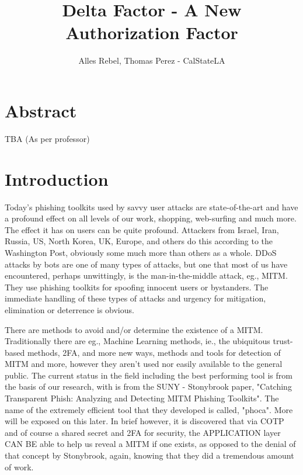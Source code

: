 \documentclass[a4paper, 11pt]{ article}
\title{Delta Factor - A New Authorization Factor}
\author{Alles Rebel, Thomas Perez - CalStateLA}
\begin{document}
\maketitle

\section{Abstract}
TBA (As per professor) %
\section{Introduction}
\setlength{\baselineskip}{1.5\baselineskip}
\indent

Today’s phishing toolkits used by savvy user attacks are state-of-the-art and have a profound effect on all levels of our work, shopping, web-surfing and much more. The effect it has on users can be quite profound. Attackers from Israel, Iran, Russia, US, North Korea, UK, Europe, and others do this according to the Washington Post, obviously some much more than others as a whole. DDoS attacks by bots are one of many types of attacks, but one that most of us have encountered, perhaps unwittingly, is the  man-in-the-middle attack, eg., MITM. They use phishing toolkits for spoofing innocent users or bystanders. The immediate handling of these types of attacks and urgency for mitigation, elimination or deterrence is obvious. 


There are methods to avoid and/or determine the existence of a MITM. Traditionally there are eg., Machine Learning methods, ie., the ubiquitous trust-based methods, 2FA, and more new ways, methods and tools for detection of MITM and more, however they aren't used nor easily available to the general public.
The current status in the field including the best performing tool is from the basis of our research, with is from the SUNY - Stonybrook paper, "Catching Transparent Phish: Analyzing and Detecting MITM  Phishing Toolkits". The name of the extremely efficient tool that they developed is called, "phoca".
More will be exposed on this later. In brief however, it is discovered that via COTP and of course a shared secret and 2FA for security, the APPLICATION layer CAN BE able to help us reveal a MITM if one exists, as opposed to the denial of that concept by Stonybrook, again, knowing that they did a tremendous amount of work. 
\end{document}
